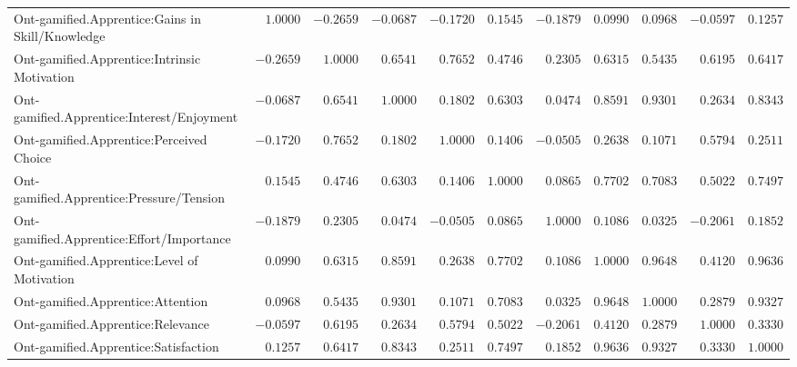 \begin{landscape}
{\begin{longtable}{lrrrrrrrrrr}
Ont-gamified.Apprentice:Gains in Skill/Knowledge&$ 1.0000$&$-0.2659$&$-0.0687$&$-0.1720$&$0.1545$&$-0.1879$&$0.0990$&$0.0968$&$-0.0597$&$0.1257$\tabularnewline
Ont-gamified.Apprentice:Intrinsic Motivation&$-0.2659$&$ 1.0000$&$ 0.6541$&$ 0.7652$&$0.4746$&$ 0.2305$&$0.6315$&$0.5435$&$ 0.6195$&$0.6417$\tabularnewline
Ont-gamified.Apprentice:Interest/Enjoyment&$-0.0687$&$ 0.6541$&$ 1.0000$&$ 0.1802$&$0.6303$&$ 0.0474$&$0.8591$&$0.9301$&$ 0.2634$&$0.8343$\tabularnewline
Ont-gamified.Apprentice:Perceived Choice&$-0.1720$&$ 0.7652$&$ 0.1802$&$ 1.0000$&$0.1406$&$-0.0505$&$0.2638$&$0.1071$&$ 0.5794$&$0.2511$\tabularnewline
Ont-gamified.Apprentice:Pressure/Tension&$ 0.1545$&$ 0.4746$&$ 0.6303$&$ 0.1406$&$1.0000$&$ 0.0865$&$0.7702$&$0.7083$&$ 0.5022$&$0.7497$\tabularnewline
Ont-gamified.Apprentice:Effort/Importance&$-0.1879$&$ 0.2305$&$ 0.0474$&$-0.0505$&$0.0865$&$ 1.0000$&$0.1086$&$0.0325$&$-0.2061$&$0.1852$\tabularnewline
Ont-gamified.Apprentice:Level of Motivation&$ 0.0990$&$ 0.6315$&$ 0.8591$&$ 0.2638$&$0.7702$&$ 0.1086$&$1.0000$&$0.9648$&$ 0.4120$&$0.9636$\tabularnewline
Ont-gamified.Apprentice:Attention&$ 0.0968$&$ 0.5435$&$ 0.9301$&$ 0.1071$&$0.7083$&$ 0.0325$&$0.9648$&$1.0000$&$ 0.2879$&$0.9327$\tabularnewline
Ont-gamified.Apprentice:Relevance&$-0.0597$&$ 0.6195$&$ 0.2634$&$ 0.5794$&$0.5022$&$-0.2061$&$0.4120$&$0.2879$&$ 1.0000$&$0.3330$\tabularnewline
Ont-gamified.Apprentice:Satisfaction&$ 0.1257$&$ 0.6417$&$ 0.8343$&$ 0.2511$&$0.7497$&$ 0.1852$&$0.9636$&$0.9327$&$ 0.3330$&$1.0000$\tabularnewline
\hline

\end{longtable}}\end{landscape}



